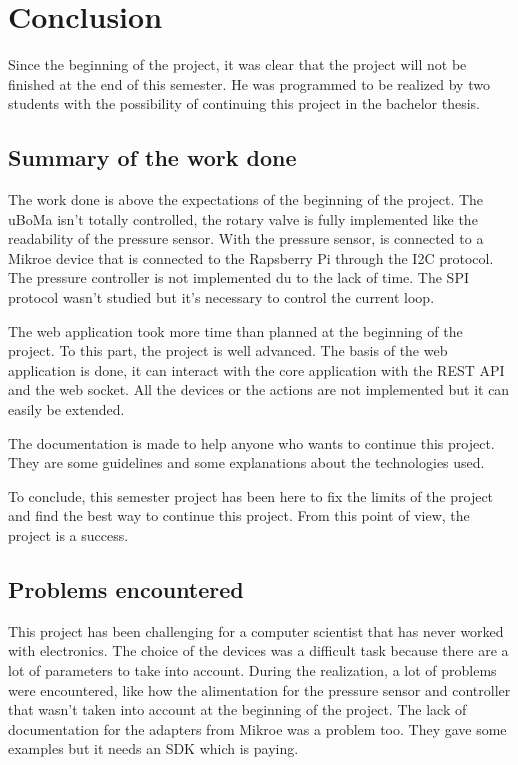 \chapter{Conclusion}
\label{ch:conclusion}

Since the beginning of the project, it was clear that the project will not be finished at the end of this semester.
He was programmed to be realized by two students with the possibility of continuing this project in the bachelor thesis.

\section{Summary of the work done}
\label{ch:conclusion:summary}

The work done is above the expectations of the beginning of the project.
The uBoMa isn't totally controlled, the rotary valve is fully implemented like the readability of the pressure sensor.
With the pressure sensor, is connected to a Mikroe device that is connected to the Rapsberry Pi through the I2C protocol.
The pressure controller is not implemented du to the lack of time.
The SPI protocol wasn't studied but it's necessary to control the current loop.

The web application took more time than planned at the beginning of the project.
To this part, the project is well advanced.
The basis of the web application is done, it can interact with the core application with the REST API and the web socket.
All the devices or the actions are not implemented but it can easily be extended.

The documentation is made to help anyone who wants to continue this project.
They are some guidelines and some explanations about the technologies used.

To conclude, this semester project has been here to fix the limits of the project and find the best way to continue this project.
From this point of view, the project is a success.


\section{Problems encountered}
\label{ch:conclusion:problems}

This project has been challenging for a computer scientist that has never worked with electronics.
The choice of the devices was a difficult task because there are a lot of parameters to take into account.
During the realization, a lot of problems were encountered, like how the alimentation for the pressure sensor and controller that wasn't taken into account at the beginning of the project.
The lack of documentation for the adapters from Mikroe was a problem too.
They gave some examples but it needs an SDK which is paying.


